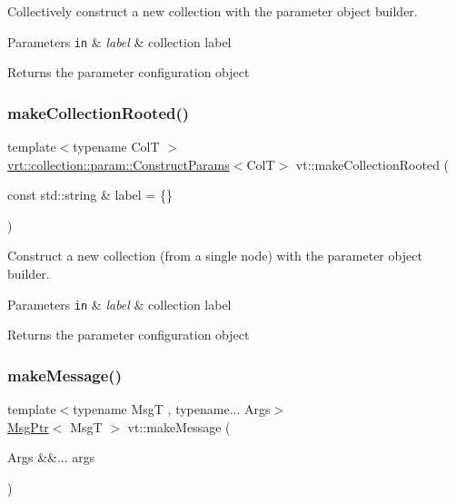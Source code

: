 Collectively construct a new collection with the parameter object builder. 


\begin{DoxyParams}[1]{Parameters}
\mbox{\tt in}  & {\em label} & collection label\\
\hline
\end{DoxyParams}
\begin{DoxyReturn}{Returns}
the parameter configuration object 
\end{DoxyReturn}
\mbox{\label{namespacevt_acbbf58b2c85959c964a7ae8c536fe9bc}} 
\subsubsection{\texorpdfstring{make\+Collection\+Rooted()}{makeCollectionRooted()}}
{\footnotesize\ttfamily template$<$typename ColT $>$ \\
\hyperlink{structvt_1_1vrt_1_1collection_1_1param_1_1_construct_params}{vrt\+::collection\+::param\+::\+Construct\+Params}$<$ColT$>$ vt\+::make\+Collection\+Rooted (\begin{DoxyParamCaption}\item[{const std\+::string \&}]{label = {\ttfamily \{\}} }\end{DoxyParamCaption})}



Construct a new collection (from a single node) with the parameter object builder. 


\begin{DoxyParams}[1]{Parameters}
\mbox{\tt in}  & {\em label} & collection label\\
\hline
\end{DoxyParams}
\begin{DoxyReturn}{Returns}
the parameter configuration object 
\end{DoxyReturn}
\mbox{\label{namespacevt_a948c0bbe39c34326b5453065a461ebaa}} 
\subsubsection{\texorpdfstring{make\+Message()}{makeMessage()}}
{\footnotesize\ttfamily template$<$typename MsgT , typename... Args$>$ \\
\hyperlink{namespacevt_a9f5ebd62ee9d6dd8829e3e1cc4f858e9}{Msg\+Ptr}$<$ MsgT $>$ vt\+::make\+Message (\begin{DoxyParamCaption}\item[{Args \&\&...}]{args }\end{DoxyParamCaption})}



